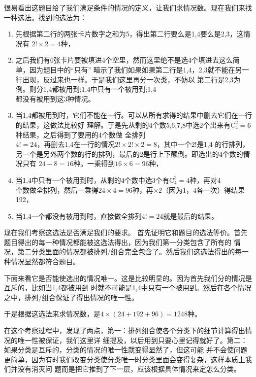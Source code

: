 很易看出这题目给了我们满足条件的情况的定义，让我们求情况数。现在我们来找一种选法。找到的选法为：
\begin{enumerate}
\item 先根据第二行的两张卡片数字之和为5，得出第二行要么是1,4要么是2,3，这情况有
$2! \times 2 = 4$种，
\item 之后我们有6张卡片要被填进4个空里，然而这里绝不是选4个填进去这么简单，因为题目中的``只有''
暗示了我们如果如果第二行是1,4，2,3就不能在另一行出现，反过来也一样。于是我们这里再分一次类，不妨以
第二行是2,3为例。则分1,4都被用到;1,4中只有一个被用到;1,4 \\
都没有被用到这3种情况。
\item 当1,4都被用到时，它们不能在一行。可以从所有求得的结果中删去它们在一行的结果，这做法比较好
理解。于是先从剩的4个数5,6,7,8中选2个出来有\(\text{C}_4^2=6\)种结果，之后得到了要用的4个数做
全排列 \\ 
\(4!=24\)，再删去1,4在一行的情况\(2! \times 2! \times 2 = 8\)，其中一个\(2!\)是1,4
的行排列，另一个是另外两个数的行的排列，最后的2是行上下颠倒。即选出的4个数的情况只有
\(24 - 8 = 16\)种。一乘得到\(16 \times 6 = 96\)种，
\item 当1,4中只有一个被用到时，从剩的4个数中选3个有\(\text{C}_4^3=4\)种，再对4\\
个数做全排列，然后一乘得\(24 \times 4 = 96\)种，再$\times 2$（因为1，4各一次）得结果192，
\item 当1,4一个都没有被用到时，直接做全排列\(4!=24\)就是最后的结果。
\end{enumerate}

现在我们考察这选法是否满足我们的要求。
首先证明它和题目的选法等价。首先题目得出的每一种情况都能被这选法得出，因为我们第一分类包含了所有的
情况，第二分类里面的情况都被排列/组合完全包含了。然后我们这选法得出的每一种情况显然都符合题目。

下面来看它是否能使选出的情况唯一。这是比较明显的。因为首先我们分的情况是互斥的，比如当1,4都被用到
时就不可能是1,4中只有一个被用到。然后在各个情况之中，排列/组合保证了得出情况的唯一性。

于是根据这选法来求情况数，是\(4 \times (24+192+96) = 1248\)种。

在这个考察过程中，发现了两点，第一：排列组合使各个分类下的细节计算得出情况的唯一性被保证，我们这里详
细提及，以后用到只要心里记得就好了。第二：如果分类是互斥的，分类的情况的唯一性就变得显然了，但这可能
并不会使问题更简单，因为有时我们改变分类使分类唯一时分类里面会变得复杂，这样本质上我们并没有消灭问
题而是把它推到了下一层，应该根据具体情况来定怎么分类。

